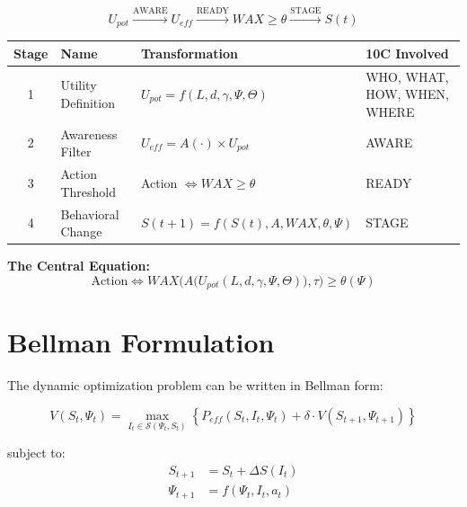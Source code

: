 \begin{equation}
\boxed{
U_{pot} \xrightarrow{\text{AWARE}} U_{eff} \xrightarrow{\text{READY}} WAX \geq \theta \xrightarrow{\text{STAGE}} S(t)
}
\end{equation}

\begin{center}
\renewcommand{\arraystretch}{1.4}
\begin{tabular}{clll}
\toprule
\textbf{Stage} & \textbf{Name} & \textbf{Transformation} & \textbf{10C Involved} \\
\midrule
1 & Utility Definition & $U_{pot} = f(L, d, \gamma, \Psi, \Theta)$ & WHO, WHAT, HOW, WHEN, WHERE \\
2 & Awareness Filter & $U_{eff} = A(\cdot) \times U_{pot}$ & AWARE \\
3 & Action Threshold & Action $\Leftrightarrow WAX \geq \theta$ & READY \\
4 & Behavioral Change & $S(t+1) = f(S(t), A, WAX, \theta, \Psi)$ & STAGE \\
\bottomrule
\end{tabular}
\end{center}

\textbf{The Central Equation:}
\begin{equation}
\text{Action} \Leftrightarrow WAX\Big(A\big(U_{pot}(L, d, \gamma, \Psi, \Theta)\big), \tau\Big) \geq \theta(\Psi)
\end{equation}

\section{Bellman Formulation}
\label{sec:mp-bellman}

The dynamic optimization problem can be written in Bellman form:

\begin{equation}
\boxed{
V(S_t, \Psi_t) = \max_{I_t \in \mathcal{S}(\Psi_t, S_t)} \left\{ P_{eff}(S_t, I_t, \Psi_t) + \delta \cdot V(S_{t+1}, \Psi_{t+1}) \right\}
}
\label{eq:mp-bellman}
\end{equation}

subject to:
\begin{align}
S_{t+1} &= S_t + \Delta S(I_t) \\
\Psi_{t+1} &= f(\Psi_t, I_t, a_t)
\end{align}

